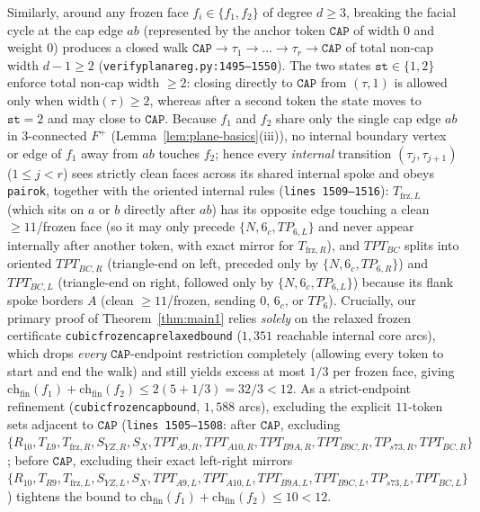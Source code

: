 \documentclass[11pt,reqno]{amsart}
\theoremstyle{plain}
\theoremstyle{definition}
\theoremstyle{remark}
\newcommand{\chf}{\mathrm{ch}_{\mathrm{fin}}}
\DeclareRobustCommand{\_}{\ifmmode\text{\textunderscore}\else\textunderscore\allowbreak\fi}
\begin{document}
Similarly, around any frozen face $f_i \in \{f_1, f_2\}$ of degree $d \ge 3$, breaking the facial cycle at the cap edge $ab$ (represented by the anchor token $\texttt{CAP}$ of width $0$ and weight $0$) produces a closed walk $\texttt{CAP} \to \tau_1 \to \dots \to \tau_r \to \texttt{CAP}$ of total non-cap width $d - 1 \ge 2$ (\texttt{verify\_planar\_eg.py:1495--1550}). The two states $\texttt{st} \in \{1, 2\}$ enforce total non-cap width $\ge 2$: closing directly to $\texttt{CAP}$ from $(\tau, 1)$ is allowed only when $\mathrm{width}(\tau) \ge 2$, whereas after a second token the state moves to $\texttt{st} = 2$ and may close to $\texttt{CAP}$. Because $f_1$ and $f_2$ share only the single cap edge $ab$ in $3$-connected $F^+$ (Lemma~\ref{lem:plane-basics}(iii)), no internal boundary vertex or edge of $f_1$ away from $ab$ touches $f_2$; hence every \emph{internal} transition $(\tau_j, \tau_{j+1})$ ($1 \le j < r$) sees strictly clean faces across its shared internal spoke and obeys \texttt{pair\_ok\_33}, together with the oriented internal rules (\texttt{lines 1509--1516}): $T_{\mathrm{frz},L}$ (which sits on $a$ or $b$ directly after $ab$) has its opposite edge touching a clean $\ge 11$/frozen face (so it may only precede $\{N, 6_c, TP_{6,L}\}$ and never appear internally after another token, with exact mirror for $T_{\mathrm{frz},R}$), and $TPT_{BC}$ splits into oriented $TPT_{BC,R}$ (triangle-end on left, preceded only by $\{N, 6_c, TP_{6,R}\}$) and $TPT_{BC,L}$ (triangle-end on right, followed only by $\{N, 6_c, TP_{6,L}\}$) because its flank spoke borders $A$ (clean $\ge 11$/frozen, sending $0$, $6_c$, or $TP_6$). Crucially, our primary proof of Theorem~\ref{thm:main1} relies \emph{solely} on the relaxed frozen certificate \texttt{cubic\_frozen\_cap\_relaxed\_bound} ($1{,}351$ reachable internal core arcs), which drops \emph{every} $\texttt{CAP}$-endpoint restriction completely (allowing every token to start and end the walk) and still yields excess at most $1/3$ per frozen face, giving $\chf(f_1) + \chf(f_2) \le 2(5 + 1/3) = 32/3 < 12$. As a strict-endpoint refinement (\texttt{cubic\_frozen\_cap\_bound}, $1{,}588$ arcs), excluding the explicit $11$-token sets adjacent to $\texttt{CAP}$ (\texttt{lines 1505--1508}: after $\texttt{CAP}$, excluding $\{R_{10},\allowbreak T_{L9},\allowbreak T_{\mathrm{frz},R},\allowbreak S_{YZ,R},\allowbreak S_X,\allowbreak TPT_{A9,R},\allowbreak TPT_{A10,R},\allowbreak TPT_{B9A,R},\allowbreak TPT_{B9C,R},\allowbreak TP_{s73,R},\allowbreak TPT_{BC,R}\}$; before $\texttt{CAP}$, excluding their exact left-right mirrors $\{R_{10},\allowbreak T_{R9},\allowbreak T_{\mathrm{frz},L},\allowbreak S_{YZ,L},\allowbreak S_X,\allowbreak TPT_{A9,L},\allowbreak TPT_{A10,L},\allowbreak TPT_{B9A,L},\allowbreak TPT_{B9C,L},\allowbreak TP_{s73,L},\allowbreak TPT_{BC,L}\}$) tightens the bound to $\chf(f_1) + \chf(f_2) \le 10 < 12$.
\end{document}

